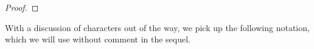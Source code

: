 \begin{proof}
\end{proof}
With a discussion of characters out of the way, we pick up the following notation, which we will use without comment in the sequel.
